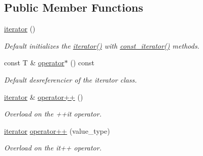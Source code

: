 \subsection*{Public Member Functions}
\begin{DoxyCompactItemize}
\item 
\mbox{\label{classsc_1_1list_1_1iterator_acd90feec03d8a2762f36407a27166bb9}} 
\mbox{\hyperlink{classsc_1_1list_1_1iterator_acd90feec03d8a2762f36407a27166bb9}{iterator}} ()
\begin{DoxyCompactList}\small\item\em Default initializes the \mbox{\hyperlink{classsc_1_1list_1_1iterator_acd90feec03d8a2762f36407a27166bb9}{iterator()}} with \mbox{\hyperlink{classsc_1_1list_1_1const__iterator_a1df8ebba371776a05ee07ae91834ea92}{const\+\_\+iterator()}} methods. \end{DoxyCompactList}\item 
\mbox{\label{classsc_1_1list_1_1iterator_a8e1feb979567a3fa27add54563d0008f}} 
const T \& \mbox{\hyperlink{classsc_1_1list_1_1iterator_a8e1feb979567a3fa27add54563d0008f}{operator$\ast$}} () const
\begin{DoxyCompactList}\small\item\em Default desreferencier of the iterator class. \end{DoxyCompactList}\item 
\mbox{\label{classsc_1_1list_1_1iterator_aed5c46c8e0c470a9eccb5e47d0c80f4c}} 
\mbox{\hyperlink{classsc_1_1list_1_1iterator}{iterator}} \& \mbox{\hyperlink{classsc_1_1list_1_1iterator_aed5c46c8e0c470a9eccb5e47d0c80f4c}{operator++}} ()
\begin{DoxyCompactList}\small\item\em Overload on the ++it operator. \end{DoxyCompactList}\item 
\mbox{\label{classsc_1_1list_1_1iterator_af3fb0443a14cecf4c2fc4e43a2701c51}} 
\mbox{\hyperlink{classsc_1_1list_1_1iterator}{iterator}} \mbox{\hyperlink{classsc_1_1list_1_1iterator_af3fb0443a14cecf4c2fc4e43a2701c51}{operator++}} (value\+\_\+type)
\begin{DoxyCompactList}\small\item\em Overload on the it++ operator. \end{DoxyCompactList}\item 

\end{DoxyCompactItemize}
